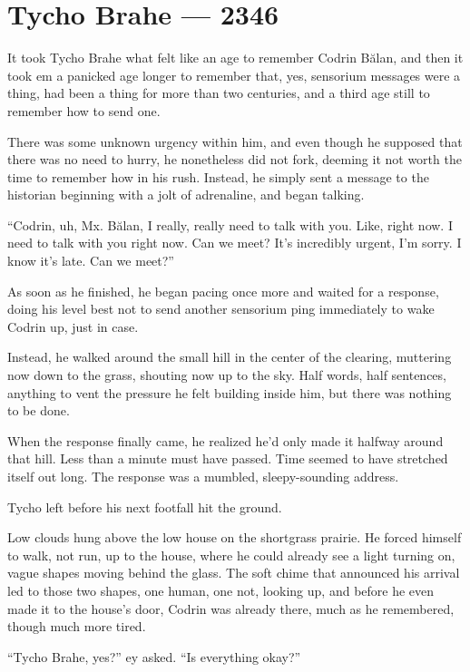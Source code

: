 \hypertarget{tycho-brahe-2346}{%
\chapter{Tycho Brahe — 2346}\label{tycho-brahe-2346}}

It took Tycho Brahe what felt like an age to remember Codrin Bălan, and then it took em a panicked age longer to remember that, yes, sensorium messages were a thing, had been a thing for more than two centuries, and a third age still to remember how to send one.

There was some unknown urgency within him, and even though he supposed that there was no need to hurry, he nonetheless did not fork, deeming it not worth the time to remember how in his rush. Instead, he simply sent a message to the historian beginning with a jolt of adrenaline, and began talking.

``Codrin, uh, Mx. Bălan, I really, really need to talk with you. Like, right now. I need to talk with you right now. Can we meet? It's incredibly urgent, I'm sorry. I know it's late. Can we meet?''

As soon as he finished, he began pacing once more and waited for a response, doing his level best not to send another sensorium ping immediately to wake Codrin up, just in case.

Instead, he walked around the small hill in the center of the clearing, muttering now down to the grass, shouting now up to the sky. Half words, half sentences, anything to vent the pressure he felt building inside him, but there was nothing to be done.

When the response finally came, he realized he'd only made it halfway around that hill. Less than a minute must have passed. Time seemed to have stretched itself out long. The response was a mumbled, sleepy-sounding address.

Tycho left before his next footfall hit the ground.

Low clouds hung above the low house on the shortgrass prairie. He forced himself to walk, not run, up to the house, where he could already see a light turning on, vague shapes moving behind the glass. The soft chime that announced his arrival led to those two shapes, one human, one not, looking up, and before he even made it to the house's door, Codrin was already there, much as he remembered, though much more tired.

``Tycho Brahe, yes?'' ey asked. ``Is everything okay?''

